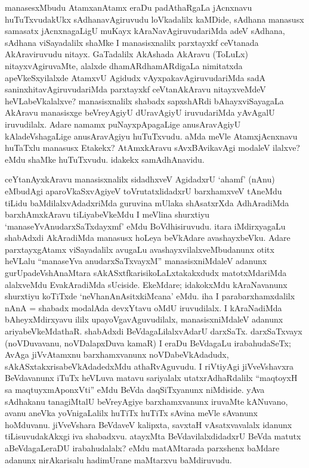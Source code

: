 \begin{artha}
manasesxMbudu AtamxanAtamx eraDu padAthaRgaLa jAcnxnavu huTuTxvudakUkx sAdhanavAgiruvudu loVkadalilx kaMDide, sAdhana manasusx samasatx jAcnxnagaLigU muKayx kAraNavAgiruvudariMda adeV sAdhana, sAdhana viSayadalilx shaMke I manasisxnalilx parxtayxkf ceVtanada AkAraviruvudu nitayx. GaTadalilx AkAshada AkAravu (ToLuLx) nitayxvAgiruvaMte, alalxde dhamARdhamARdigaLa nimitatxda apeVkeSxyilalxde AtamxvU Agidudx vAyxpakavAgiruvudariMda sadA saninxhitavAgiruvudariMda parxtayxkf ceVtanAkAravu nitayxveMdeV heVLabeVkalalxve? manasisxnalilx shabadx sapxshARdi bAhayxviSayagaLa AkAravu manasisxge beVreyAgiyU dUravAgiyU iruvudariMda yAvAgalU iruvudilalx. Adare namamx puNayxpApagaLige anusAravAgiyU kAladeVshagaLige anusAravAgiyu huTuTxvudu. aMda meVle AtamxjAcnxnavu huTaTxlu manasusx Etakekx? AtAmxkAravu sAvxBAvikavAgi modaleV ilalxve? eMdu shaMke huTuTxvudu. \ndash  idakekx samAdhAnavidu. 

ceYtanAyxkAravu manasisxnalilx sidadhxveV AgidadxrU `ahamf' (nAnu) eMbudAgi aparoVkaSxvAgiyeV toVrutatxlidadxrU barxhamxveV tAneMdu tiLidu baMdilalxvAdadxriMda guruvina mUlaka shAsatxrXda AdhAradiMda barxhAmxkAravu tiLiyabeVkeMdu I meVlina shurxtiyu `manaseYvAnudarxSaTxdayxmf' eMdu BoVdhisiruvudu. itara iMdirxyagaLu shabAdxdi AkAradiMda manasusx hoLeya beVkAdare avashayxbeVku. Adare parxtayxgAtamx viSayadalilx avugaLu avashayxvilalxveMbudanunx otitx heVLalu ``manaseYva anudarxSaTxvayxM'' manasisxniMdaleV adanunx gurUpadeVshAnaMtara sAkASxtfkarisikoLaLxtakakxdudx matotxMdariMda alalxveMdu EvakAradiMda sUciside. EkeMdare; idakokxMdu kAraNavanunx shurxtiyu koTiTxde `neVhanAnAsitxkiMcana' eMdu. iha I parabarxhamxdalilx nAnA = shabadx modalAda devxYtavu oMdU iruvudilalx. I kAraNadiMda bAheyxMdirxyavu ililx upayoVgavAguvudilalx, manasisxniMdaleV adanunx ariyabeVkeMdathaR. shabAdxdi BeVdagaLilalxvAdarU darxSaTx. darxSaTxvayx (noVDuvavanu, noVDalapxDuva kamaR) I eraDu BeVdagaLu irabahudaSeTx; AvAga jiVvAtamxnu barxhamxvanunx noVDabeVkAdadudx, sAkASxtakxrisabeVkAdadedxMdu athaRvAguvudu. I riVtiyAgi jiVveVshavxra BeVdavanunx iTuTx heVLuva matavu sariyalalx \ndash  utatxrAdhaRdalilx ``maqtoyxH sa maqtuyxmAponxVti'' eMdu BeVda daqSiTxyanunx niMdiside. yAva sAdhakanu tanagiMtalU beVreyAgiye barxhamxvanunx iruvaMte kANuvano, avanu aneVka yoVnigaLalilx huTiTx huTiTx sAvina meVle sAvanunx hoMduvanu. jiVveVshara BeVdaveV kalipxta, savxtaH vAsatxvavalalx idanunx tiLisuvudakAkxgi iva shabadxvu. atayxMta BeVdavilalxdidadxrU BeVda matutx aBeVdagaLeraDU irabahudalalx? eMdu matAMtarada parxshenx baMdare adanunx nirAkarisalu hadimUrane maMtarxvu baMdiruvudu.
\end{artha}


